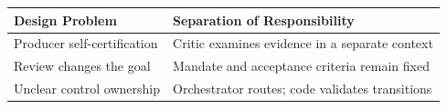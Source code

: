 \begin{tabular}{@{}P{4.2cm}P{8.3cm}@{}}
\toprule
\textbf{Design Problem} & \textbf{Separation of Responsibility} \\
\midrule
Producer self-certification & Critic examines evidence in a separate context \\
Review changes the goal & Mandate and acceptance criteria remain fixed \\
Unclear control ownership & Orchestrator routes; code validates transitions \\
\bottomrule
\end{tabular}
